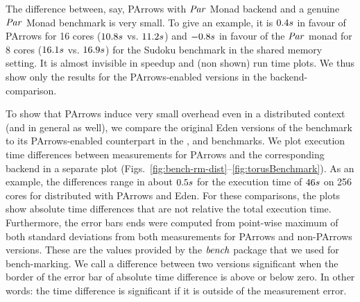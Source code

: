 The difference between, say, PArrows with \ensuremath{\Conid{Par}} Monad backend and a
genuine \ensuremath{\Conid{Par}}
Monad benchmark is very small. To give an example, it is $0.4s$ in favour of PArrows for 16 cores ($10.8s$ vs. $11.2s$) and $-0.8s$ in favour of the \ensuremath{\Conid{Par}} monad for 8 cores ($16.1s$ vs. $16.9s$) for
the Sudoku benchmark in the shared memory setting. It is almost invisible in speedup and
(non shown) run time plots. We thus show only the results for the
PArrows-enabled versions in the backend-comparison.

To show that PArrows induce very small overhead even in a distributed context (and in general as well), we compare the original Eden
versions of the benchmark to its PArrows-enabled counterpart in the \rmtest, \torustest and \jacobitest benchmarks. We plot execution time differences between measurements for
PArrows and the corresponding backend in a separate plot
(Figs.~\ref{fig:bench-rm-dist}--\ref{fig:torusBenchmark}). As an example, the differences range in
about $0.5s$ for the execution time of $46s$ on 256 cores
for distributed \rmtest with PArrows and Eden. For these comparisons, the plots show absolute
time differences that are not relative \wrt the total execution time.
Furthermore, the error bars ends were computed from point-wise maximum of both standard
deviations from both measurements for PArrows and non-PArrows
versions. These are the values provided by the \ensuremath{\Varid{bench}} package that we
used for bench-marking. We call a difference between two versions
significant when the border of the error bar of absolute time
difference is above or below zero. In other words: the time
difference is significant if it is outside of the measurement error.

\subsubsection{\rmtest}\label{sec:rmtest}

\newcommand{\performanceSkelRMSM}[2]{
\performanceplot{Parallel run time of \rmtest \enquote{#2}}{Eden CP, GpH, \ensuremath{\Conid{Par}} Monad}{16}{4}{
\addplot+ [very thick] table [scatter, x="nCores", y="time", col sep=comma, mark=none,
smooth]{benchmarks/sm-rm/bench-sm-rm.bench.skelrm-parr-eden-cp-#1-#2.csv};
\addplot+ [very thick] table [scatter, x="nCores", y="time", col sep=comma, mark=none,
smooth]{benchmarks/sm-rm/bench-sm-rm.bench.skelrm-parr-mult-#1-#2.csv};
\addplot+ [very thick] table [scatter, x="nCores", y="time", col sep=comma, mark=none,
smooth]{benchmarks/sm-rm/bench-sm-rm.bench.skelrm-parr-par-#1-#2.csv};
}{17}{\plotwidthSMP}
}

